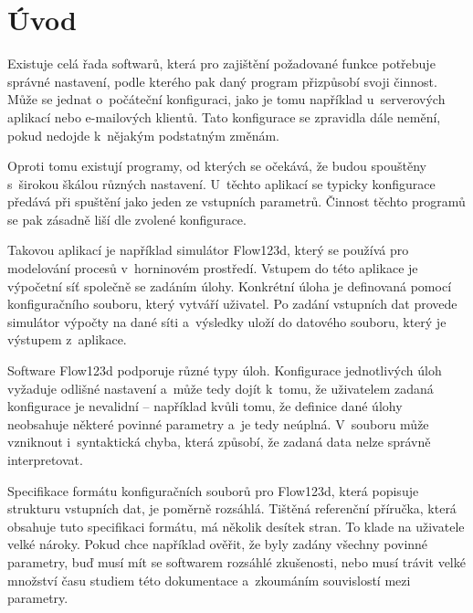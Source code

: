 \documentclass[FM,bw,DP]{tulthesis}
\begin{document}
\listoffigures
\clearpage



\printnoidxglossary[type=\acronymtype,title=Seznam zkratek]


\chapter*{Úvod}

Existuje celá řada softwarů, která pro zajištění požadované funkce potřebuje správné nastavení, podle kterého pak daný program přizpůsobí svoji činnost. Může se jednat o~počáteční konfiguraci, jako je tomu například u~serverových aplikací nebo e-mailových klientů. Tato konfigurace se zpravidla dále nemění, pokud nedojde k~nějakým podstatným změnám.

Oproti tomu existují programy, od kterých se očekává, že budou spouštěny s~širokou škálou různých nastavení. U~těchto aplikací se typicky konfigurace předává při spuštění jako jeden ze vstupních parametrů. Činnost těchto programů se pak zásadně liší dle zvolené konfigurace.

Takovou aplikací je například simulátor Flow123d, který se používá pro modelování procesů v~horninovém prostředí. Vstupem do této aplikace je výpočetní síť společně se zadáním úlohy. Konkrétní úloha je definovaná pomocí konfiguračního souboru, který vytváří uživatel. Po zadání vstupních dat provede simulátor výpočty na dané síti a~výsledky uloží do datového souboru, který je výstupem z~aplikace.

Software Flow123d podporuje různé typy úloh. Konfigurace jednotlivých úloh vyžaduje odlišné nastavení a~může tedy dojít k~tomu, že uživatelem zadaná konfigurace je nevalidní -- například kvůli tomu, že definice dané úlohy neobsahuje některé povinné parametry a~je tedy neúplná. V~souboru může vzniknout i~syntaktická chyba, která způsobí, že zadaná data nelze správně interpretovat.

Specifikace formátu konfiguračních souborů pro Flow123d, která popisuje strukturu vstupních dat, je poměrně rozsáhlá. Tištěná referenční příručka, která obsahuje tuto specifikaci formátu, má několik desítek stran. To klade na uživatele velké nároky. Pokud chce například ověřit, že byly zadány všechny povinné parametry, buď musí mít se softwarem rozsáhlé zkušenosti, nebo musí trávit velké množství času studiem této dokumentace a~zkoumáním souvislostí mezi parametry.
\end{document}
